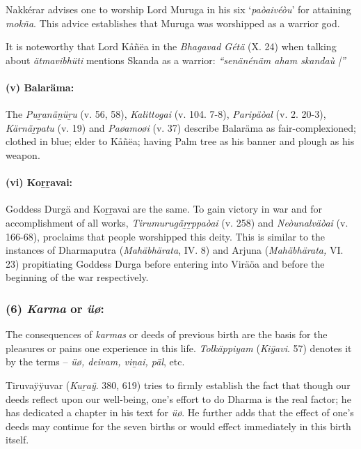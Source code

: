 Nakkérar advises one to worship Lord Muruga in his six ‘\textit{paòaivéòu}’ for attaining \textit{mokña}. This advice establishes that Muruga was worshipped as a warrior god.

It is noteworthy that Lord Kåñëa in the \textit{Bhagavad Gétä} (X. 24) when talking about \textit{ätmavibhüti} mentions Skanda as a warrior: \textit{“senänénäm aham skandaù |”}


\paragraph*{(v) Balaräma:}

The \textit{Puṟanäṉüṟu} (v. 56, 58), \textit{Kalittogai} (v. 104. 7-8), \textit{Paripäòal} (v. 2. 20-3), \textit{Kärnäṟpatu} (v. 19) and \textit{Paøamoøi} (v. 37) describe Balaräma as fair-complexioned; clothed in blue; elder to Kåñëa; having Palm tree as his banner and plough as his weapon.


\paragraph*{(vi) Koṟṟavai:}

Goddess Durgä and Koṟṟavai are the same. To gain victory in war and for accomplishment of all works, \textit{Tirumurugäṟṟppaòai} (v. 258) and \textit{Neòunalväòai} (v. 166-68), proclaims that people worshipped this deity. This is similar to the instances of Dharmaputra (\textit{Mahäbhärata}, IV. 8) and Arjuna (\textit{Mahäbhärata,} VI. 23) propitiating Goddess Durga before entering into Viräöa and before the beginning of the war respectively.


\subsubsection*{(6) \textit{Karma} or \textit{üø}:}

The consequences of \textit{karmas} or deeds of previous birth are the basis for the pleasures or pains one experience in this life. \textit{Tolkäppiyam} (\textit{Kiÿavi}. 57) denotes it by the terms – \textit{üø, deivam, viṉai, päl}, etc.

Tiruvaÿÿuvar (\textit{Kuṟaÿ}. 380, 619) tries to firmly establish the fact that though our deeds reflect upon our well-being, one’s effort to do Dharma is the real factor; he has dedicated a chapter in his text for \textit{üø}. He further adds that the effect of one’s deeds may continue for the seven births or would effect immediately in this birth itself.

